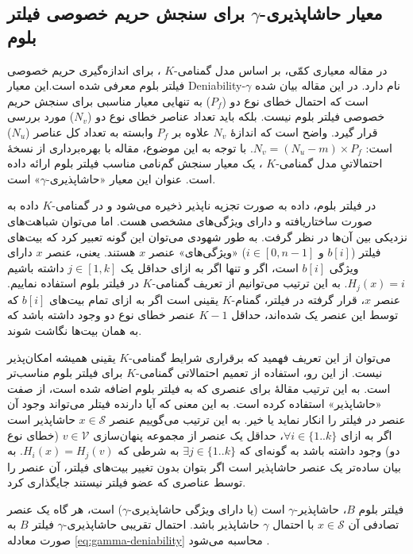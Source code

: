 \subsection{معیار 
	حاشاپذیری-$\gamma$ برای
	سنجش حریم خصوصی فیلتر بلوم}
\label{gamma-deniability}

در مقاله \cite{Bianchi2012} معیاری کمّی، بر اساس مدل گمنامی-$K$ 
\cite{Sweeney2002}،
برای اندازه‌گیری حریم خصوصی فیلتر بلوم معرفی شده است.این معیار
\gls{Deniability}-$\gamma$
نام دارد. در این مقاله بیان شده است که احتمال خطای نوع دو ($P_f$) به تنهایی معیار مناسبی برای سنجش حریم خصوصی فیلتر بلوم نیست. بلکه باید تعداد عناصر خطای نوع دو ($N_v$) مورد بررسی قرار گیرد. واضح است که اندازهٔ $N_v$ علاوه بر $P_f$ وابسته به تعداد کل عناصر ($N_u$) است:
$N_v=(N_u-m)\times P_f$.
با توجه به این موضوع، مقاله \cite{Bianchi2012} با بهره‌برداری از نسخهٔ احتمالاتیِ مدل گمنامی-$K$
\cite{Lodha2008}،
یک معیار سنجش گم‌نامی مناسب فیلتر بلوم ارائه داده است. عنوان این معیار «حاشاپذیری-$\gamma$» است. 

در فیلتر بلوم، داده به صورت تجزیه ناپذیر ذخیره می‌شود و در گمنامی-$K$ داده به صورت ساختاریافته و دارای ویژگی‌های مشخصی هست. اما می‌توان شباهت‌های نزدیکی بین آن‌ها در نظر گرفت. به طور شهودی می‌توان این گونه تعبیر کرد که بیت‌های فیلتر ($b[i]$ و $i\in[0,n-1]$) «ویژگی‌های» عنصر $x$ هستند. یعنی، عنصر $x$ دارای ویژگی $b[i]$ است، اگر و تنها اگر به ازای حداقل یک 
$j\in[1,k]$ داشته باشیم 
$H_j(x)=i$.
به این ترتیب می‌توانیم از تعریف گمنامی-$K$ در فیلتر بلوم استفاده نماییم. عنصر $x$، قرار گرفته در فیلتر، گمنام-$K$ یقینی است اگر به ازای تمام بیت‌های $b[i]$  که توسط این عنصر یک شده‌اند، حداقل $K-1$ عنصر خطای نوع دو وجود داشته باشد که به همان بیت‌ها نگاشت شوند.

می‌توان از این تعریف فهمید که برقراری شرایط گمنامی-$K$ یقینی همیشه امکان‌پذیر نیست. از این رو، استفاده از تعمیم احتمالاتی گمنامی-$K$ 
\cite{Lodha2008} 
برای فیلتر بلوم مناسب‌تر است. به این ترتیب مقالهٔ \cite{Bianchi2012} برای عنصری که به فیلتر بلوم اضافه شده است، از صفت «حاشاپذیر» استفاده کرده است.  به این معنی که آیا دارنده فیتلر می‌تواند وجود آن عنصر در فیلتر را انکار نماید یا خیر. به این ترتیب می‌گوییم عنصر $x\in \mathcal{S}$ حاشاپذیر است اگر به ازای 
$\forall i \in \{1..k\}$،
حداقل یک عنصر از مجموعه پنهان‌سازی $v\in \mathcal{V}$ (خطای نوع دو) وجود داشته باشد به گونه‌ای که 
$\exists j \in \{1..k\}$
به شرطی که 
$H_i(x) = H_j(v)$.
به بیان ساده‌تر یک عنصر حاشا‌پذیر است اگر بتوان بدون تغییر بیت‌های فیلتر، آن عنصر را توسط عناصری که عضو فیلتر نیستند جایگذاری کرد. 

فیلتر بلوم $B$، حاشاپذیر-$\gamma$ است (یا دارای ویژگی حاشاپذیری-$\gamma$) است، هر گاه یک عنصر تصادفی آن $x\in \mathcal{S}$ با احتمال $\gamma$ حاشاپذیر باشد. احتمال تقریبی حاشاپذیری-$\gamma$ فیلتر $B$ به صورت معادله \eqref{eq:gamma-deniability} محاسبه می‌شود  \cite{Bianchi2012}.

